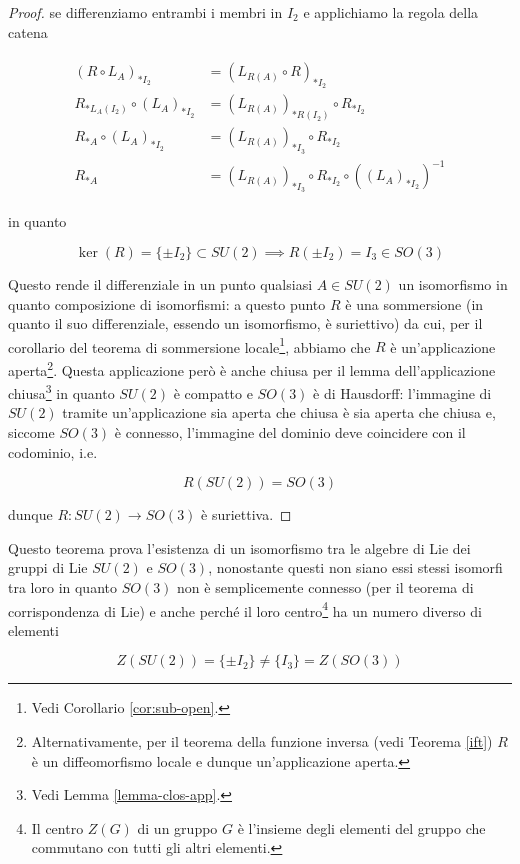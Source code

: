 \begin{proof}
	se differenziamo entrambi i membri in $ I_{2} $ e applichiamo la regola della catena
	
	\begin{align}
		\begin{split}
			(R \circ L_{A})_{*I_{2}} &= (L_{R(A)} \circ R)_{*I_{2}} \\
			R_{*L_{A}(I_{2})} \circ (L_{A})_{*I_{2}} &= (L_{R(A)})_{*R(I_{2})} \circ R_{*I_{2}} \\
			R_{*A} \circ (L_{A})_{*I_{2}} &= (L_{R(A)})_{*I_{3}} \circ R_{*I_{2}} \\
			R_{*A} &= (L_{R(A)})_{*I_{3}} \circ R_{*I_{2}} \circ ((L_{A})_{*I_{2}})^{-1}
		\end{split}
	\end{align}

	in quanto
	
	\begin{equation}
		\ker(R) = \{\pm I_{2}\} \subset SU(2) %
		\implies %
		R(\pm I_{2}) = I_{3} \in SO(3)
	\end{equation}
	
	Questo rende il differenziale in un punto qualsiasi $ A \in SU(2) $ un isomorfismo in quanto composizione di isomorfismi: a questo punto $ R $ è una sommersione (in quanto il suo differenziale, essendo un isomorfismo, è suriettivo) da cui, per il corollario del teorema di sommersione locale\footnote{%
		Vedi Corollario \ref{cor:sub-open}.%
	}, abbiamo che $ R $ è un'applicazione aperta\footnote{%
		Alternativamente, per il teorema della funzione inversa (vedi Teorema \ref{ift}) $ R $ è un diffeomorfismo locale e dunque un'applicazione aperta.%
	}. Questa applicazione però è anche chiusa per il lemma dell'applicazione chiusa\footnote{%
		Vedi Lemma \ref{lemma-clos-app}.%
	} in quanto $ SU(2) $ è compatto e $ SO(3) $ è di Hausdorff: l'immagine di $ SU(2) $ tramite un'applicazione sia aperta che chiusa è sia aperta che chiusa e, siccome $ SO(3) $ è connesso, l'immagine del dominio deve coincidere con il codominio, i.e.

	\begin{equation}
		R(SU(2)) = SO(3)
	\end{equation}
	
	dunque $ R : SU(2) \to SO(3) $ è suriettiva.
\end{proof}

\begin{remark}
	Questo teorema prova l'esistenza di un isomorfismo tra le algebre di Lie dei gruppi di Lie $ SU(2) $ e $ SO(3) $, nonostante questi non siano essi stessi isomorfi tra loro in quanto $ SO(3) $ non è semplicemente connesso (per il teorema di corrispondenza di Lie) e anche perché il loro centro\footnote{%
		Il centro $ Z(G) $ di un gruppo $ G $ è l'insieme degli elementi del gruppo che commutano con tutti gli altri elementi.%
	} ha un numero diverso di elementi
	
	\begin{equation}
		Z(SU(2)) = \{ \pm I_{2} \} \neq \{ I_{3} \} = Z(SO(3))
	\end{equation}
\end{remark}

